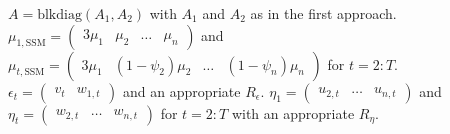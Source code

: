 \documentclass[12pt,a4paper]{scrartcl}
\begin{document}
$A = \mathrm{blkdiag}(A_1, A_2)$ with $A_1$ and $A_2$ as in the first approach. $\mu_{1,\mathrm{SSM}} = \begin{pmatrix} 3\mu_1& \mu_2 & \dots & \mu_n \end{pmatrix}$ and $\mu_{t,\mathrm{SSM}} = \begin{pmatrix} 3\mu_1& (1-\psi_2)\mu_2 & \dots & (1-\psi_n)\mu_n \end{pmatrix}$ for $t=2:T$. $\epsilon_t = \begin{pmatrix} v_t & w_{1,t} \end{pmatrix}$ and an appropriate $R_\epsilon$. $\eta_1 = \begin{pmatrix} u_{2,t} & \dots & u_{n,t} \end{pmatrix}$ and $\eta_t = \begin{pmatrix} w_{2,t} & \dots & w_{n,t} \end{pmatrix}$ for $t=2:T$ with an appropriate $R_\eta$.

%
%
\end{document}
